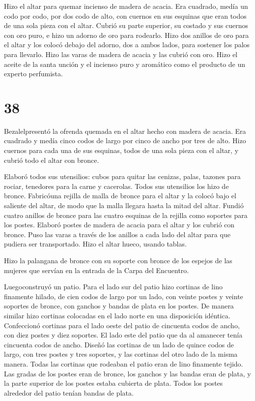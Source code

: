  Hizo el altar para quemar incienso de madera de acacia.
Era cuadrado, medía un codo por codo, por dos codo de alto, con cuernos
en sus esquinas que eran todos de una sola pieza con el altar.
 Cubrió su parte superior, su costado y sus cuernos con oro
puro, e hizo un adorno de oro para rodearlo.  Hizo dos
anillos de oro para el altar y los colocó debajo del adorno, dos a ambos
lados, para sostener los palos para llevarlo.  Hizo las
varas de madera de acacia y las cubrió con oro.  Hizo el
aceite de la santa unción y el incienso puro y aromático como el
producto de un experto perfumista.

\hypertarget{section-37}{%
\section{38}\label{section-37}}

 Bezalelpresentó la ofrenda quemada en el altar hecho con
madera de acacia. Era cuadrado y medía cinco codos de largo por cinco de
ancho por tres de alto.  Hizo cuernos para cada una de sus
esquinas, todos de una sola pieza con el altar, y cubrió todo el altar
con bronce.

 Elaboró todos sus utensilios: cubos para quitar las
cenizas, palas, tazones para rociar, tenedores para la carne y
cacerolas. Todos sus utensilios los hizo de bronce. 
Fabricóuna rejilla de malla de bronce para el altar y la colocó bajo el
saliente del altar, de modo que la malla llegara hasta la mitad del
altar.  Fundió cuatro anillos de bronce para las cuatro
esquinas de la rejilla como soportes para los postes. 
Elaboró postes de madera de acacia para el altar y los cubrió con
bronce.  Puso las varas a través de los anillos a cada lado
del altar para que pudiera ser transportado. Hizo el altar hueco, usando
tablas.

 Hizo la palangana de bronce con su soporte con bronce de
los espejos de las mujeres que servían en la entrada de la Carpa del
Encuentro.

 Luegoconstruyó un patio. Para el lado sur del patio hizo
cortinas de lino finamente hilado, de cien codos de largo por un lado,
 con veinte postes y veinte soportes de bronce, con ganchos
y bandas de plata en los postes.  De manera similar hizo
cortinas colocadas en el lado norte en una disposición idéntica.
 Confeccionó cortinas para el lado oeste del patio de
cincuenta codos de ancho, con diez postes y diez soportes. 
El lado este del patio que da al amanecer tenía cincuenta codos de
ancho.  Diseñó las cortinas de un lado de quince codos de
largo, con tres postes y tres soportes,  y las cortinas del
otro lado de la misma manera.  Todas las cortinas que
rodeaban el patio eran de lino finamente tejido.  Las
gradas de los postes eran de bronce, los ganchos y las bandas eran de
plata, y la parte superior de los postes estaba cubierta de plata. Todos
los postes alrededor del patio tenían bandas de plata.


